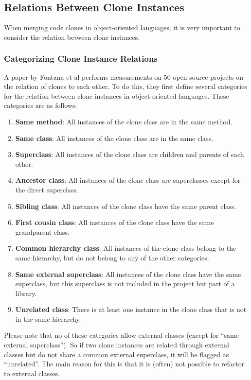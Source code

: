 \documentclass[a4paper]{article}
\begin{document}
\subsection{Relations Between Clone Instances}
When merging code clones in object-oriented languages, it is very important to consider the relation between clone instances.

\subsubsection{Categorizing Clone Instance Relations}
A paper by Fontana et al \cite{fontana2015duplicated} performs measurements on 50 open source projects on the relation of clones to each other. To do this, they first define several categories for the relation between clone instances in object-oriented languages. These categories are as follows:
\begin{enumerate}
  \item \textbf{Same method}: All instances of the clone class are in the same method.
  \item \textbf{Same class}: All instances of the clone class are in the same class.
  \item \textbf{Superclass}: All instances of the clone class are children and parents of each other.
  \item \textbf{Ancestor class}: All instances of the clone class are superclasses except for the direct superclass.
  \item \textbf{Sibling class}: All instances of the clone class have the same parent class.
  \item \textbf{First cousin class}: All instances of the clone class have the same grandparent class.
\item \textbf{Common hierarchy class}: All instances of the clone class belong to the same hierarchy, but do not belong to any of the other categories.
\item \textbf{Same external superclass}: All instances of the clone class have the same superclass, but this superclass is not included in the project but part of a library.
\item \textbf{Unrelated class}: There is at least one instance in the clone class that is not in the same hierarchy.
\end{enumerate}
Please note that no of these categories allow external classes (except for ``same external superclass''). So if two clone instances are related through external classes but do not share a common external superclass, it will be flagged as ``unrelated''. The main reason for this is that it is (often) not possible to refactor to external classes.
\end{document}

